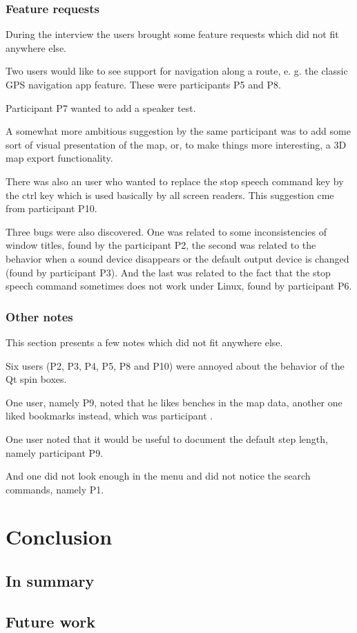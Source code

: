 \documentclass[nolof,digital]{fithesis3}
\begin{document}
\subsection{Feature requests}
During the interview the users brought some feature requests which did not fit anywhere else.

Two users would like to see support for navigation along a route, e. g. the classic GPS navigation app feature. These were participants P5 and P8.

Participant P7 wanted to add a speaker test.

A somewhat more ambitious suggestion by the same participant was to add some sort of visual presentation of the map, or, to make things more interesting, a 3D map export functionality.

There was also an user who wanted to replace the stop speech command key by the ctrl key which is used basically by all screen readers. This suggestion cme from participant P10.

Three bugs were also discovered. One was related to some inconsistencies of window titles, found by the participant P2, the second was related to the behavior when a sound device disappears or the default output device is changed (found by participant P3). And the last was related to the fact that the stop speech command sometimes does not work under Linux, found by participant P6.
\subsection{Other notes}
This section presents a few notes which did not fit anywhere else.

Six users (P2, P3, P4, P5, P8 and P10) were annoyed about the behavior of the Qt spin boxes.

One user, namely P9, noted that he likes benches in the map data, another one liked bookmarks instead, which was participant .

One user noted that it would be useful to document the default step length, namely participant P9.

And one did not look enough in the menu and did not notice the search commands, namely P1.
\chapter{Conclusion}
\section{In summary}
\section{Future work}
\end{document}

